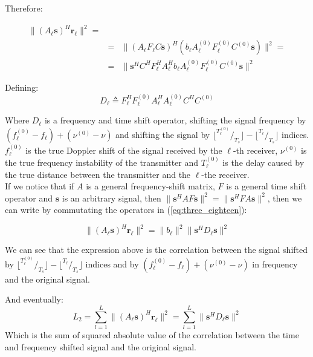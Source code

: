Therefore:

\begin{eqnarray}
\label{eq:three_eighteen}
\|(A_\ell\mathbf{s})^H\mathbf{r_\ell}\|^2 =\\
&=&\|(A_\ell F_\ell C\mathbf{s})^H(b_\ell A_\ell^{(0)} F_\ell^{(0)} C^{(0)} \mathbf{s})\|^2= \nonumber \\
&=&\|\mathbf{s}^H C^H F_\ell^H A_\ell^H b_\ell A_\ell^{(0)} F_\ell^{(0)} C^{(0)} \mathbf{s}\|^2 \nonumber
\end{eqnarray}

Defining:
\begin{equation}
D_\ell \triangleq  F_\ell^H  F_\ell^{(0)} A_\ell^H A^{(0)}_\ell C^H C^{(0)}
\end{equation}

Where $D_\ell$ is a frequency and time shift operator, shifting the signal frequency by $(f^{(0)}_\ell-f_\ell)+(\nu^{(0)}-\nu)$ and shifting the signal by $\lfloor ^{T_\ell^{(0)}}/_{T_s} \rfloor- \lfloor ^{T_\ell}/_{T_s} \rfloor$ indices. $f^{(0)}_\ell$ is the true Doppler shift of the signal received by the $\ell$-th receiver, $\nu^{(0)}$ is the true frequency instability of the transmitter and $T_\ell^{(0)}$ is the delay caused by the true distance between the transmitter and the $\ell$-the receiver.
\\
If we notice that if $A$ is a general frequency-shift matrix, $F$ is a general time shift
operator and $\mathbf{s}$ is an arbitrary signal, then $\|\mathbf{s}^H AF \mathbf{s}\|^2=\|\mathbf{s}^H FA\mathbf{s}\|^2$,
then we can write by commutating the operators in (\ref{eq:three_eighteen}):

\begin{equation}
\|(A_\ell\mathbf{s})^H\mathbf{r_\ell}\|^2 = \|b_\ell\|^2\|\mathbf{s}^H D_\ell \mathbf{s}\|^2
\end{equation}

We can see that the expression above is the correlation between the signal shifted by $\lfloor ^{T_\ell^{(0)}}/_{T_s} \rfloor- \lfloor ^{T_\ell}/_{T_s} \rfloor$ indices and by $(f^{(0)}_\ell-f_\ell)+(\nu^{(0)}-\nu)$ in frequency and the original signal.

And eventually:
\begin{equation}
\label{eq:3_21}
L_2 = \sum_{l=1}^L \|(A_\ell\mathbf{s})^H\mathbf{r_\ell}\|^2 = \sum_{l=1}^L \|\mathbf{s}^H D_\ell \mathbf{s}\|^2
\end{equation}
Which is the sum of squared absolute value of the correlation between the time and frequency shifted signal and the original signal.

